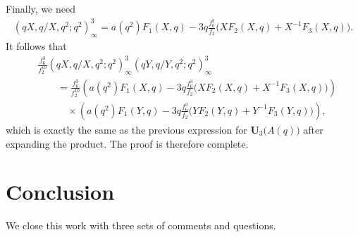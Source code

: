 \documentclass[12pt,reqno]{amsart}
\numberwithin{equation}{section}
\theoremstyle{plain}
\theoremstyle{definition}
\theoremstyle{named}
\newcommand{\UU}{\mathbf{U}}
\begin{document}
Finally, we need \cite[p.~180, eq.~(21.2.4)]{Hir}
\begin{align*}
	(qX,q/X,q^2;q^2)_\infty^3 = a(q^2)F_1(X,q) - 3q \frac{f_6^3}{f_2}\big(XF_2(X,q) + X^{-1}F_3(X,q)\big).
\end{align*}
It follows that
\begin{align*}
	&\frac{f_6^3}{f_2^{10}} (qX,q/X,q^2;q^2)_\infty^3 (qY,q/Y,q^2;q^2)_\infty^3\\
	&\qquad = \frac{f_6^3}{f_2^{10}} \left(a(q^2)F_1(X,q) - 3q \frac{f_6^3}{f_2}\big(XF_2(X,q) + X^{-1}F_3(X,q)\big)\right)\\
	&\qquad\quad\times \left(a(q^2)F_1(Y,q) - 3q \frac{f_6^3}{f_2}\big(YF_2(Y,q) + Y^{-1}F_3(Y,q)\big)\right),
\end{align*}
which is exactly the same as the previous expression for $\UU_3\big(A(q)\big)$ after expanding the product. The proof is therefore complete.

\section{Conclusion}\label{sec:conclusion}

We close this work with three sets of comments and questions. 
\end{document}
